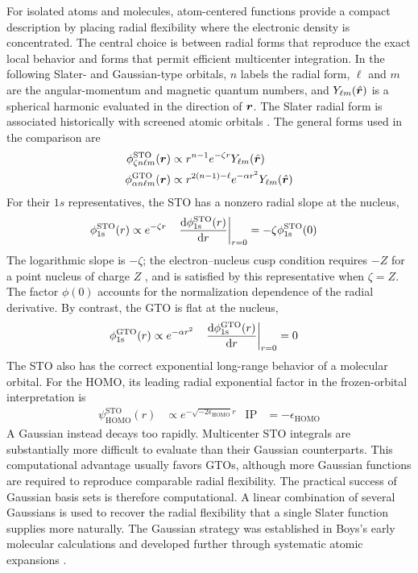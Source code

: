 For isolated atoms and molecules, atom-centered functions provide a compact
description by placing radial flexibility where the electronic density is
concentrated. The central choice is between radial forms that reproduce the
exact local behavior and forms that permit efficient multicenter integration.
In the following Slater- and Gaussian-type orbitals, $n$ labels the radial
form, $\ell$ and $m$ are the angular-momentum and magnetic quantum numbers,
and $Y_{\ell m}(\hat{\boldsymbol{r}})$ is a spherical harmonic evaluated in the direction
of $\boldsymbol{r}$. The Slater radial form is associated historically with screened atomic
orbitals \citep{Slater1930Orbitals}. The general forms used in the comparison are
\begin{equation}
\begin{split}
  \phi_{\zeta n\ell m}^\text{STO}(\boldsymbol{r})
 &\propto r^{n-1}e^{-\zeta r}Y_{\ell m}(\hat{\boldsymbol{r}})
  \\
  \phi_{\alpha n\ell m}^\text{GTO}(\boldsymbol{r})
 &\propto r^{2(n-1)-\ell}e^{-\alpha r^2}Y_{\ell m}(\hat{\boldsymbol{r}})
\end{split}
\end{equation}
For their $1s$ representatives, the STO has a nonzero radial slope at the nucleus,
\begin{align}
  \phi_\text{1s}^\text{STO}(r)&\propto e^{-\zeta r}
  &
  \eval{\dv{\phi_\text{1s}^\text{STO}(r)}{r}}_{r=0}
 &=-\zeta\phi_\text{1s}^\text{STO}(0)
\end{align}
The logarithmic slope is $-\zeta$; the electron--nucleus cusp condition
requires $-Z$ for a point nucleus of charge $Z$ \citep{Kato1957}, and is satisfied by this
representative when $\zeta=Z$. The factor $\phi(0)$ accounts for the
normalization dependence of the radial derivative.
By contrast, the GTO is flat at the nucleus,
\begin{align}
  \phi_\text{1s}^\text{GTO}(r)&\propto e^{-\alpha r^2}
  &
  \eval{\dv{\phi_\text{1s}^\text{GTO}(r)}{r}}_{r=0}&=0
\end{align}
The STO also has the correct exponential long-range behavior of a molecular
orbital. For the HOMO, its leading radial exponential factor in the
frozen-orbital interpretation is
\begin{align}
  \psi_\text{HOMO}^\text{STO}(r)
 &\propto e^{-\sqrt{-2\epsilon_\text{HOMO}}r}
  &
  \mathrm{IP}&=-\epsilon_\text{HOMO}
\end{align}
A Gaussian instead decays too rapidly. Multicenter STO integrals are
substantially more difficult to evaluate than their Gaussian counterparts.
This computational advantage usually favors GTOs, although more Gaussian
functions are required to reproduce comparable radial flexibility.
The practical success of Gaussian basis sets is therefore computational. A
linear combination of several Gaussians is used to recover the radial
flexibility that a single Slater function supplies more naturally. The
Gaussian strategy was established in Boys's early molecular calculations
and developed further through systematic atomic expansions
\citep{Boys1950,Huzinaga1965}.


